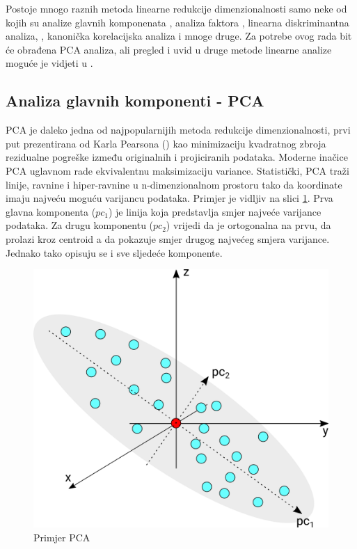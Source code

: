 \documentclass[times, utf8, diplomski]{fer}
\begin{document}
Postoje mnogo raznih metoda linearne redukcije dimenzionalnosti samo neke od kojih su analize glavnih komponenata , analiza faktora , linearna diskriminantna analiza, , kanonička korelacijska analiza  i mnoge druge. Za potrebe ovog rada bit će obrađena PCA analiza, ali pregled i uvid u druge metode linearne analize moguće je vidjeti u \cite{cunningham2015linear}.

\subsection{Analiza glavnih komponenti - PCA}

PCA je daleko jedna od najpopularnijih metoda redukcije dimenzionalnosti, prvi put prezentirana od Karla Pearsona (\citeyear{pearson1901liii}) kao minimizaciju kvadratnog zbroja rezidualne pogreške između originalnih i projiciranih podataka. Moderne inačice PCA uglavnom rade ekvivalentnu maksimizaciju variance. Statistički, PCA traži linije, ravnine i hiper-ravnine u n-dimenzionalnom prostoru tako da koordinate imaju najveću moguću varijancu podataka. Primjer je vidljiv na slici \ref{fig:pca}. Prva glavna komponenta ($pc_1$) je linija koja predstavlja smjer najveće varijance podataka. Za drugu komponentu ($pc_2$) vrijedi da je ortogonalna na prvu, da prolazi kroz centroid a da pokazuje smjer drugog najvećeg smjera varijance. Jednako tako opisuju se i sve sljedeće komponente.
\begin{figure}[htb]
    \centering
    \includegraphics{resources/images/reduction/pca.png}
    \caption{Primjer PCA}
    \label{fig:pca}
\end{figure}
\end{document}
